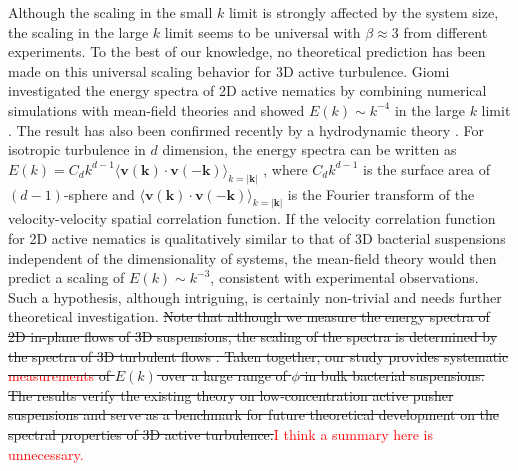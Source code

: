 \documentclass[twocolumn,aps,prx,amsmath,amssymb,longbibliography,superscriptaddress]{revtex4-2}
\begin{document}
Although the scaling in the small $k$ limit is strongly affected by the system size, the scaling in the large $k$ limit seems to be universal with $\beta \approx 3$ from different experiments. To the best of our knowledge, no theoretical prediction has been made on this universal scaling behavior for 3D active turbulence. Giomi investigated the energy spectra of 2D active nematics by combining numerical simulations with mean-field theories and showed $E(k) \sim k^{-4}$ in the large $k$ limit \cite{Giomi2015}.
The result has also been confirmed recently by a hydrodynamic theory \cite{Alert2020}. For isotropic turbulence in $d$ dimension, the energy spectra can be written as $E(k) = C_d k^{d-1} \langle \mathbf{v}(\mathbf{k})\cdot \mathbf{v}(-\mathbf{k})\rangle_{k = |\mathbf{k}|}$ \cite{Wensink2012,Bardfalvy2019},
where $C_d k^{d-1}$ is the surface area of $(d-1)$-sphere and $\langle \mathbf{v}(\mathbf{k})\cdot \mathbf{v}(-\mathbf{k})\rangle_{k = |\mathbf{k}|}$ is the Fourier transform of the velocity-velocity spatial correlation function. If the velocity correlation function for 2D active nematics is qualitatively similar to that of 3D bacterial suspensions independent of the dimensionality of systems, the mean-field theory would then predict a scaling of $E(k) \sim k^{-3}$, consistent with experimental observations. Such a hypothesis, although intriguing, is certainly non-trivial and needs further theoretical investigation.
\sout{Note that although we measure the energy spectra of 2D in-plane flows of 3D suspensions, the scaling of the spectra is determined by the spectra of 3D turbulent flows \cite{Pope2000}.
Taken together, our study provides systematic \textcolor{red}{measurements}
of $E(k)$ over a large range of $\phi$ in bulk bacterial suspensions. The results verify the existing theory on low-concentration active pusher suspensions and serve as a benchmark for future theoretical development on the spectral properties of 3D active turbulence.}\textcolor{red}{I think a summary here is unnecessary.}
\end{document}
